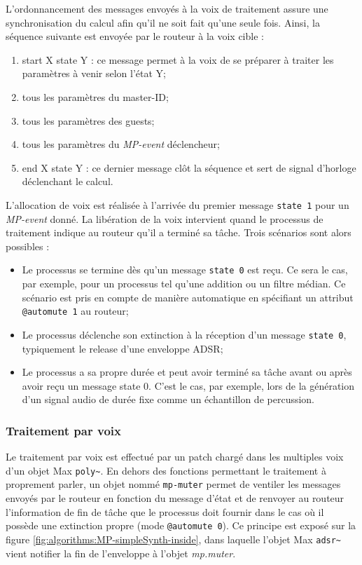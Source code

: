 \noindent L'ordonnancement des messages envoyés à la voix de traitement assure une synchronisation du calcul afin qu'il ne soit fait qu'une seule fois. Ainsi, la séquence suivante est envoyée par le routeur à la voix cible :
\vspace{-1em}
\begin{enumerate}[noitemsep]
	\item start X state Y : ce message permet à la voix de se préparer à traiter les paramètres à venir selon l'état Y;
	\item tous les paramètres du master-ID;
	\item tous les paramètres des guests;
	\item tous les paramètres du \textit{MP-event} déclencheur;
	\item end X state Y : ce dernier message clôt la séquence et sert de signal d'horloge déclenchant le calcul.
\end{enumerate}

\noindent L'allocation de voix est réalisée à l'arrivée du premier message \verb|state 1| pour un \textit{MP-event} donné. La libération de la voix intervient quand le processus de traitement indique au routeur qu'il a terminé sa tâche. Trois scénarios sont alors possibles :
\vspace{-1em}
\begin{itemize}[noitemsep]
	\item Le processus se termine dès qu'un message \verb|state 0| est reçu. Ce sera le cas, par exemple, pour un processus tel qu'une addition ou un filtre médian. Ce scénario est pris en compte de manière automatique en spécifiant un attribut \verb|@automute 1| au routeur;
	\item Le processus déclenche son extinction à la réception d'un message \verb|state 0|, typiquement le release d'une enveloppe \gls{ADSR};
	\item Le processus a sa propre durée et peut avoir terminé sa tâche avant ou après avoir reçu un message state 0. C'est le cas, par exemple, lors de la génération d'un signal audio de durée fixe comme un échantillon de percussion.
\end{itemize}

\subsubsection{Traitement par voix}

\noindent Le traitement par voix est effectué par un patch chargé dans les multiples voix d'un objet Max \verb|poly~|. En dehors des fonctions permettant le traitement à proprement parler, un objet nommé \verb|mp-muter| permet de ventiler les messages envoyés par le routeur en fonction du message d'état et de renvoyer au routeur l'information de fin de tâche que le processus doit fournir dans le cas où il possède une extinction propre (mode \verb|@automute 0|). Ce principe est exposé sur la figure \ref{fig:algorithms:MP-simpleSynth-inside}, dans laquelle l'objet Max \verb|adsr~| vient notifier la fin de l'enveloppe à l'objet \textit{mp.muter}.

